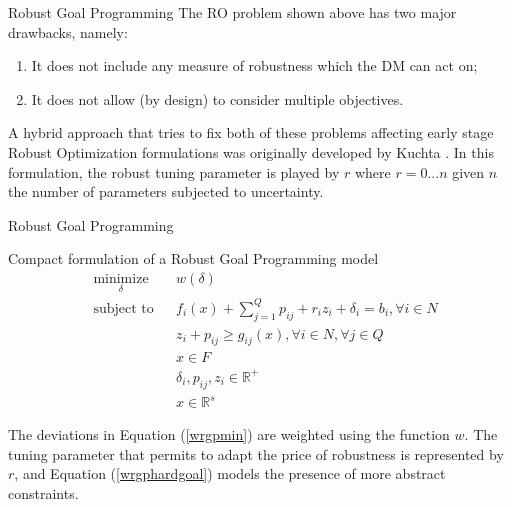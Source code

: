 \documentclass[10pt]{beamer}
\begin{document}
\begin{frame}{Robust Goal Programming}
  The RO problem shown above has two major drawbacks, namely:
  \begin{enumerate}
  \item It does not include any measure of robustness which the
    DM can act on;
  \item It does not allow (by design) to consider multiple objectives.
  \end{enumerate}
  A hybrid approach that tries to fix both of these problems affecting early stage Robust Optimization formulations was originally developed by Kuchta \cite{kuchta04}.
  In this formulation, the robust tuning parameter is played by \(r\) where \(r=0...n\) given \(n\) the number of parameters subjected to uncertainty.

\end{frame}
\begin{frame}[allowframebreaks]{Robust Goal Programming}
  \begin{alertblock}{Compact formulation of a Robust Goal Programming model}
\begin{subequations}

\begin{align}
    & \underset{\delta}{\text{minimize}} & & w(\delta) \label{wrgpmin} \\
    & \text{subject to} & & f_i(x) + \sum_{j=1}^{Q}p_{ij} + r_iz_i + \delta_i = b_i, \forall i \in N  \label{wrgpsoftgoal} \\
    & & & z_i + p_{ij} \geq g_{ij}(x), \forall i \in N , \forall j \in Q \label{wrgptuning} \\
    & & & x\in F \label{wrgphardgoal} \\
    & & & \delta_i, p_{ij}, z_i \in \mathbb{R}^{+} \label{wrgppositivity} \\
    & & & x \in \mathbb{R}^{s} \label{wrgpfeasible}
\end{align}
\end{subequations}
  \end{alertblock}

  \pagebreak
  
  The deviations in Equation (\ref{wrgpmin}) are weighted using the function $w$. The tuning parameter that permits to adapt the price of robustness \cite{bertsimas04} is represented by \(r\), and Equation (\ref{wrgphardgoal}) models the presence of more abstract constraints. 
  
\end{frame}
\end{document}
